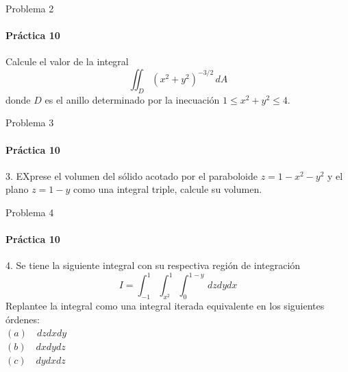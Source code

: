 \documentclass{plantillaPPT}
\begin{document}
\begin{frame}{Problema 2}
\framesubtitle{Práctica 10}
Calcule el valor de la integral
\[
\iint_D(x^2+y^2)^{-3/2}\,dA
\]
donde $D$ es el anillo determinado por la inecuación $1\leq x^2+y^2\leq 4$.
\end{frame}

\begin{frame}{Problema 3}
\framesubtitle{Práctica 10}
3. EXprese el volumen del sólido acotado por el paraboloide $z=1-x^2-y^2$ y el plano $z=1-y$ como una integral triple, calcule su volumen.
\end{frame}

\begin{frame}{Problema 4}
\framesubtitle{Práctica 10}
4. Se tiene la siguiente integral con su respectiva región de integración
\[
I = \int_{-1}^1\int_{x^2}^1\int_0^{1-y}\,dzdydx
\]
Replantee la integral como una integral iterada equivalente en los siguientes órdenes:\\[5pt]
$(a) \quad dzdxdy$\\
$(b) \quad dxdydz$\\
$(c) \quad dydxdz$
\end{frame}
\end{document}
